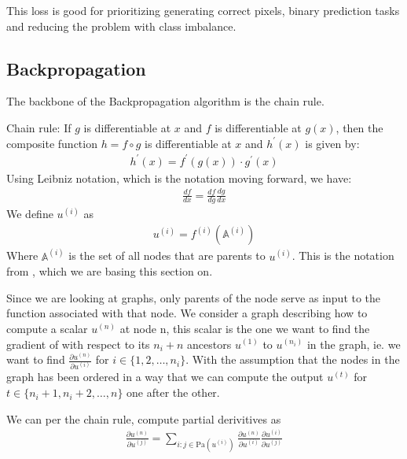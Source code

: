 \documentclass[a4paper,12pt]{article}
\begin{document}
This loss is good for prioritizing generating correct pixels, binary prediction tasks and reducing the problem with class imbalance.

\subsection{Backpropagation}
The backbone of the Backpropagation algorithm is the chain rule.

Chain rule: If $g$ is differentiable at $x$ and $f$ is differentiable at $g(x)$, then the composite function $h=f \circ g$ is differentiable at $x$ and $h^\prime(x)$ is given by:
\begin{align}
  h^\prime(x)=f^\prime(g(x))\cdot g^\prime(x)
\end{align}
Using Leibniz notation, which is the notation moving forward, we have:
\begin{align}
  \frac{d f}{d x} = \frac{d f}{d g } \frac{d g}{d x}
\end{align}
We define $u^{(i)}$ as
\begin{align}
  u^{(i)} = f^{(i)}(\mathbb{A}^{(i)})
\end{align}
Where $\mathbb{A}^{(i)}$ is the set of all nodes that are parents to $u^{(i)}$. This is the notation from \cite{Goodfellow-et-al-2016}, which we are basing this section on.

Since we are looking at graphs, only parents of the node serve as input to the function associated with that node.
We consider a graph describing how to compute a scalar $u^{(n)}$ at node n, this scalar is the one we want to find the gradient of with respect to its $n_i+n$ ancestors $u^{(1)}$ to $u^{(n_i)}$ in the graph, ie. we want to find $\frac{\partial u^{(n)}}{\partial u^{(i)}}$ for $i \in \{1,2,\dots, n_i\}$. 
With the assumption that the nodes in the graph has been ordered in a way that we can compute the output $u^{(t)}$ for $t \in \{n_i+1, n_i+2,\dots, n\}$ one after the other.

We can per the chain rule, compute partial derivitives as
\begin{align}
\frac{\partial u^{(n)}}{\partial u^{(j)}} = \sum_{i : j \in \text{Pa}(u^{(i)})} \frac{\partial u^{(n)}}{\partial u^{(i)}} \frac{\partial u^{(i)}}{\partial u^{(j)}}
\end{align}
\end{document}

